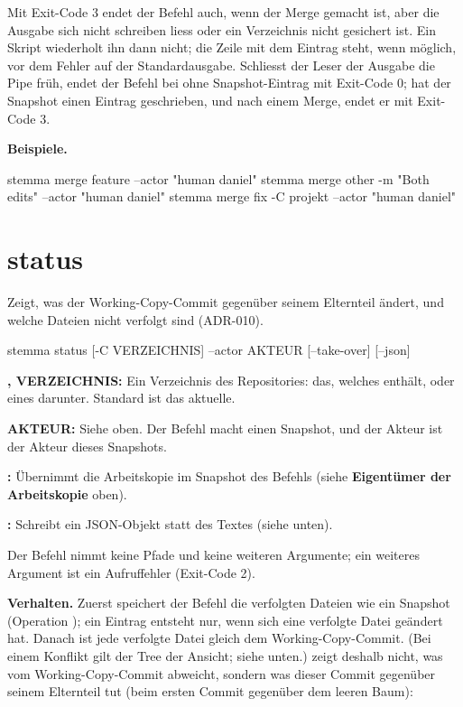 Mit Exit-Code 3 endet der Befehl auch, wenn der Merge gemacht ist,
aber die Ausgabe sich nicht schreiben liess oder ein Verzeichnis nicht gesichert ist.
Ein Skript wiederholt ihn dann nicht; die Zeile mit dem Eintrag steht, wenn möglich, vor dem
Fehler auf der Standardausgabe. Schliesst der Leser der Ausgabe die Pipe früh,
endet der Befehl bei  ohne Snapshot-Eintrag mit Exit-Code 0;
hat der Snapshot einen Eintrag geschrieben, und nach einem Merge, endet er mit Exit-Code 3.

{\bf Beispiele.}

\starttyping
stemma merge feature --actor "human daniel"
stemma merge other -m "Both edits" --actor "human daniel"
stemma merge fix -C projekt --actor "human daniel"
\stoptyping

\section{status}

Zeigt, was der Working-Copy-Commit gegenüber seinem Elternteil ändert,
und welche Dateien nicht verfolgt sind (ADR-010).

\starttyping
stemma status [-C VERZEICHNIS] --actor AKTEUR [--take-over] [--json]
\stoptyping

\startitemize
\item {\bf {},  VERZEICHNIS:} Ein Verzeichnis des Repositories:
das, welches  enthält, oder eines darunter. Standard ist das aktuelle.
\item {\bf {} AKTEUR:} Siehe oben. Der Befehl macht einen Snapshot,
und der Akteur ist der Akteur dieses Snapshots.
\item {\bf {}:} Übernimmt die Arbeitskopie im Snapshot des Befehls
(siehe {\bf Eigentümer der Arbeitskopie} oben).
\item {\bf {}:} Schreibt ein JSON-Objekt statt des Textes (siehe unten).
\stopitemize

Der Befehl nimmt keine Pfade und keine weiteren Argumente;
ein weiteres Argument ist ein Aufruffehler (Exit-Code 2).

{\bf Verhalten.} Zuerst speichert der Befehl die verfolgten Dateien wie ein Snapshot
(Operation ); ein Eintrag entsteht nur, wenn sich eine verfolgte Datei
geändert hat.
Danach ist jede verfolgte Datei gleich dem Working-Copy-Commit.
(Bei einem Konflikt gilt der Tree der Ansicht; siehe unten.)
 zeigt deshalb nicht, was vom Working-Copy-Commit abweicht,
sondern was dieser Commit gegenüber seinem Elternteil tut
(beim ersten Commit gegenüber dem leeren Baum):

